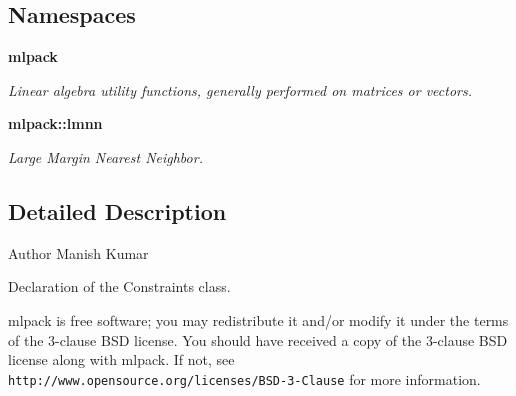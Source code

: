 \subsection*{Namespaces}
\begin{DoxyCompactItemize}
\item 
 \textbf{ mlpack}
\begin{DoxyCompactList}\small\item\em Linear algebra utility functions, generally performed on matrices or vectors. \end{DoxyCompactList}\item 
 \textbf{ mlpack\+::lmnn}
\begin{DoxyCompactList}\small\item\em Large Margin Nearest Neighbor. \end{DoxyCompactList}\end{DoxyCompactItemize}


\subsection{Detailed Description}
\begin{DoxyAuthor}{Author}
Manish Kumar
\end{DoxyAuthor}
Declaration of the Constraints class.

mlpack is free software; you may redistribute it and/or modify it under the terms of the 3-\/clause B\+SD license. You should have received a copy of the 3-\/clause B\+SD license along with mlpack. If not, see {\tt http\+://www.\+opensource.\+org/licenses/\+B\+S\+D-\/3-\/\+Clause} for more information. 
